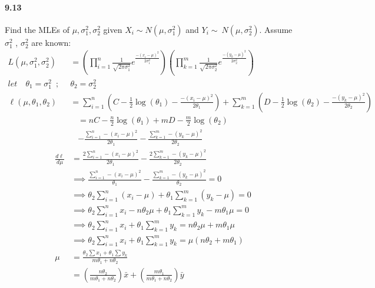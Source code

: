 \paragraph{9.13}

Find the MLEs of $\mu, \sigma_1^2, \sigma_2^2$ given $X_i \sim N(\mu,\sigma_1^2)$ and $ Y_i \sim\ N(\mu,\sigma_2^2)$. 
\enspace Assume $\sigma_1^2$ , $\sigma_2^2$ are known:
\begin{align*}
L(\mu, \sigma_1^2,\sigma_2^2) &= (\prod_{i=1}^n \frac{1}{\sqrt{2\pi\sigma_1^2}} e^\frac{-(x_i - \mu)^2}{2\sigma_1^2}) (\prod_{k=1}^m \frac{1}{\sqrt{2\pi\sigma_2^2}} e^\frac{-(y_k - \mu)^2}{2\sigma_2^2})
\\
let\quad \theta_1 = \sigma_1^2\enspace;\enspace &\theta_2 =\sigma_2^2
\\
\ell(\mu, \theta_1,\theta_2) & = \sum_{i=1}^n(C-\frac{1}{2}\log(\theta_1) - \frac{-(x_i - \mu)^2}{2\theta_1}) + \sum_{k=1}^m(D-\frac{1}{2}\log(\theta_2) - \frac{-(y_k - \mu)^2}{2\theta_2})
\end{align*} \begin{multline*}
= nC-\frac{n}{2}\log(\theta_1) + mD - \frac{m}{2}\log(\theta_2)\\-\frac{\sum_{i=1}^n -(x_i - \mu)^2}{2\theta_1} - \frac{\sum_{k=1}^m -(y_k - \mu)^2}{2\theta_2} 
\end{multline*} \begin{align*}
\frac{d \ell}{d \mu} &=
\frac{2\sum_{i=1}^n -(x_i - \mu)^2}{2\theta_1} - \frac{2\sum_{k=1}^m -(y_k - \mu)^2}{2\theta_2}
\\
&\implies\frac{\sum_{i=1}^n -(x_i - \mu)^2}{\theta_1} - \frac{\sum_{k=1}^m -(y_k - \mu)^2}{\theta_2} = 0
\\
&\implies\theta_2\sum_{i=1}^n(x_i-\mu) +\theta_1\sum_{k=1}^m(y_k-\mu) = 0
\\
&\implies\theta_2\sum_{i=1}^nx_i-n\theta_2\mu + \theta_1\sum_{k=1}^my_k-m\theta_1\mu = 0
\\
&\implies\theta_2\sum_{i=1}^nx_i + \theta_1\sum_{k=1}^my_k = n\theta_2\mu + m\theta_1\mu
\\
&\implies\theta_2\sum_{i=1}^nx_i + \theta_1\sum_{k=1}^my_k = \mu(n\theta_2 + m\theta_1)
\\
\mu &= \frac{\theta_2\sum x_1 + \theta_1\sum y_k}{m\theta_1 + n\theta_2}
\\
&= (\frac{n\theta_2}{m\theta_1+n\theta_2})\bar{x} + (\frac{m\theta_1}{m\theta_1+n\theta_2})\bar{y}
\end{align*}


